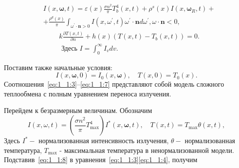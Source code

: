 \begin{equation}
    \label{eq:1_1:5}
    \begin{aligned}
        &I(x, \boldsymbol{\omega}, t)=\varepsilon(x)
        \frac{\sigma n^{2}}{\pi} T_{b}^{4}(x, t)+\rho^{s}(x) I
        \left(x, \boldsymbol{\omega}_{R}, t\right)+ \\
        & +\frac{\rho^{d}(x)}{\pi} \int_{\omega^{\prime}
        \cdot \mathbf{n}>0} I\left(x, \omega^{\prime}, t\right) \omega^{\prime}
        \cdot \mathbf{n} d \omega^{\prime}, \omega \cdot \mathbf{n}<0,
    \end{aligned}
\end{equation}
\begin{equation}
    \label{eq:1_1:6}
    \begin{aligned}
        & k \frac{\partial T(x, t)}{\partial n}
        +h(x)\left(T(x, t)-T_{b}(x, t)\right) = 0. \\
        & \text { Здесь } I=\int_{0}^{\infty} I_{v} d v.
    \end{aligned}
\end{equation}

Поставим также начальные условия:
\begin{equation}
    \label{eq:1_1:7}
    I(x, \boldsymbol{\omega}, 0)=I_{0}(x, \boldsymbol{\omega}), \quad T(x, 0)=T_{0}(x).
\end{equation}
Соотношения~\eqref{eq:1_1:3}--\eqref{eq:1_1:7} представляют собой модель сложного
теплообмена с полным уравнением переноса излучения.


Перейдем к безразмерным величинам.
Обозначим
\begin{equation}
    \label{eq:1_1:8}
    I(x, \omega, t)=\left(\frac{\sigma n^{2}}{\pi}
    T_{\max }^{4}\right) I^{*}(x, \boldsymbol{\omega}, t),
    \quad T(x, t)=T_{\max } \theta(x, t),
\end{equation}
Здесь $I^{*}-$ нормализованная интенсивность излучения,
$\theta-$ нормализованная температура, $T_{\max }$ - максимальная температура
в ненормализованной модели.
Подставив~\eqref{eq:1_1:8} в уравнения~\eqref{eq:1_1:3}\eqref{eq:1_1:4}, получим

